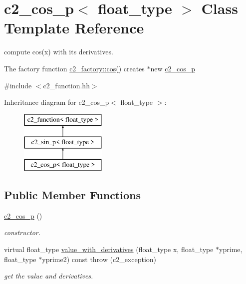\hypertarget{classc2__cos__p}{\section{c2\-\_\-cos\-\_\-p$<$ float\-\_\-type $>$ Class Template Reference}
\label{classc2__cos__p}
}


compute cos(x) with its derivatives.

The factory function \hyperlink{classc2__factory_abc5ea51417ecef590629a39f7a2227e4}{c2\-\_\-factory\-::cos()} creates $\ast$new \hyperlink{classc2__cos__p}{c2\-\_\-cos\-\_\-p}  




{\ttfamily \#include $<$c2\-\_\-function.\-hh$>$}

Inheritance diagram for c2\-\_\-cos\-\_\-p$<$ float\-\_\-type $>$\-:\begin{figure}[H]
\begin{center}
\leavevmode
\includegraphics[height=3.000000cm]{classc2__cos__p}
\end{center}
\end{figure}
\subsection*{Public Member Functions}
\begin{DoxyCompactItemize}
\item 
\hypertarget{classc2__cos__p_a407476ff0daa92ac2267e754b74ae133}{\hyperlink{classc2__cos__p_a407476ff0daa92ac2267e754b74ae133}{c2\-\_\-cos\-\_\-p} ()}\label{classc2__cos__p_a407476ff0daa92ac2267e754b74ae133}

\begin{DoxyCompactList}\small\item\em constructor. \end{DoxyCompactList}\item 
virtual float\-\_\-type \hyperlink{classc2__cos__p_ae4e275f2739d33bfbf1f2efc741535d5}{value\-\_\-with\-\_\-derivatives} (float\-\_\-type x, float\-\_\-type $\ast$yprime, float\-\_\-type $\ast$yprime2) const   throw (c2\-\_\-exception)
\begin{DoxyCompactList}\small\item\em get the value and derivatives. \end{DoxyCompactList}\end{DoxyCompactItemize}
